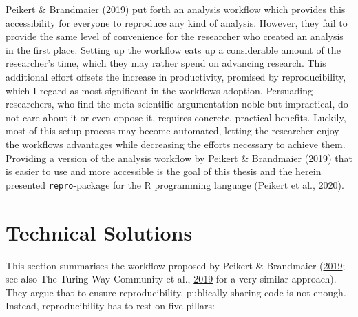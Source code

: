 \documentclass[12pt,a4paper,]{article}
\begin{document}
Peikert \& Brandmaier (\protect\hyperlink{ref-peikertReproducibleDataAnalysis2019}{2019}) put forth an analysis workflow which provides this accessibility for everyone to reproduce any kind of analysis.
However, they fail to provide the same level of convenience for the researcher who created an analysis in the first place.
Setting up the workflow eats up a considerable amount of the researcher's time, which they may rather spend on advancing research.
This additional effort offsets the increase in productivity, promised by reproducibility, which I regard as most significant in the workflows adoption.
Persuading researchers, who find the meta-scientific argumentation noble but impractical, do not care about it or even oppose it, requires concrete, practical benefits.
Luckily, most of this setup process may become automated, letting the researcher enjoy the workflows advantages while decreasing the efforts necessary to achieve them.
Providing a version of the analysis workflow by Peikert \& Brandmaier (\protect\hyperlink{ref-peikertReproducibleDataAnalysis2019}{2019}) that is easier to use and more accessible is the goal of this thesis and the herein presented \texttt{repro}-package for the R programming language (Peikert et al., \protect\hyperlink{ref-R-repro}{2020}).

\hypertarget{technical-solutions}{%
\section{Technical Solutions}\label{technical-solutions}}

This section summarises the workflow proposed by Peikert \& Brandmaier (\protect\hyperlink{ref-peikertReproducibleDataAnalysis2019}{2019}; see also The Turing Way Community et al., \protect\hyperlink{ref-theturingwaycommunityTuringWayHandbook2019}{2019} for a very similar approach).
They argue that to ensure reproducibility, publically sharing code is not enough.
Instead, reproducibility has to rest on five pillars:
\end{document}
